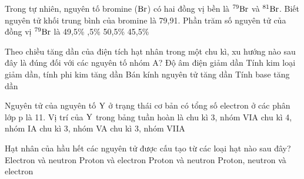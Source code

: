 \documentclass[11pt,a4paper]{article}
\begin{document}
\begin{ex}
Trong tự nhiên, nguyên tố bromine ($\ce{Br}$) có hai đồng vị bền là $^{79}\ce{Br}$ và $^{81}\ce{Br}$. Biết nguyên tử khối trung bình của bromine là 79,91. Phần trăm số nguyên tử của đồng vị $^{79}\ce{Br}$ là
\choice
{49,5\%}
{,5\%}
{50,5\%}
{45,5\%}

\end{ex}
\begin{ex}
Theo chiều tăng dần của điện tích hạt nhân trong một chu kì, xu hướng nào sau đây là đúng đối với các nguyên tố nhóm A?
\choice
{Độ âm điện giảm dần}
{\True Tính kim loại giảm dần, tính phi kim tăng dần}
{Bán kính nguyên tử tăng dần}
{Tính base tăng dần}

\end{ex}
\begin{ex}
Nguyên tử của nguyên tố $\ce{Y}$ ở trạng thái cơ bản có tổng số electron ở các phân lớp p là 11. Vị trí của $\ce{Y}$ trong bảng tuần hoàn là
\choice
{chu kì 3, nhóm VIA}
{chu kì 4, nhóm IA}
{chu kì 3, nhóm VA}
{\True chu kì 3, nhóm VIIA}

\end{ex}
\begin{ex}
Hạt nhân của hầu hết các nguyên tử được cấu tạo từ các loại hạt nào sau đây?
\choice
{Electron và neutron}
{Proton và electron}
{\True Proton và neutron}
{Proton, neutron và electron}

\end{ex}
\end{document}
